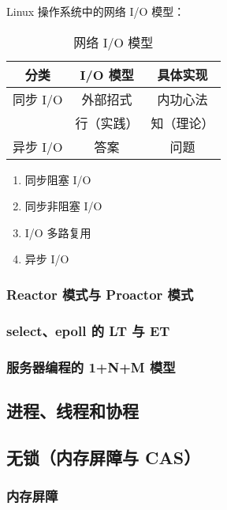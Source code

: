 \documentclass[cn,normal,12pt]{../elegantnote}
\begin{document}
Linux 操作系统中的网络 I/O 模型：
\begin{table}[!htbp]
  \small
  \centering
  \caption{网络 I/O 模型}
    \begin{tabular}{c|c|c}
    \toprule
            分类    &       I/O 模型            &          具体实现        \\
    \midrule
            同步 I/O     &     外部招式        &      内功心法      \\
                    &     行（实践）      &      知（理论）    \\
            异步 I/O       &       答案          &        问题        \\
    \bottomrule
    \end{tabular}%
  \label{tab:niom}%
\end{table}%

\begin{enumerate}
   \item 同步阻塞 I/O
   \item 同步非阻塞 I/O
   \item I/O 多路复用
   \item 异步 I/O
\end{enumerate}

\subsubsection{Reactor 模式与 Proactor 模式}

\subsubsection{select、epoll 的 LT 与 ET}

\subsubsection{服务器编程的 1+N+M 模型}

\subsection{进程、线程和协程}

\subsection{无锁（内存屏障与 CAS）}

\subsubsection{内存屏障}
\end{document}
